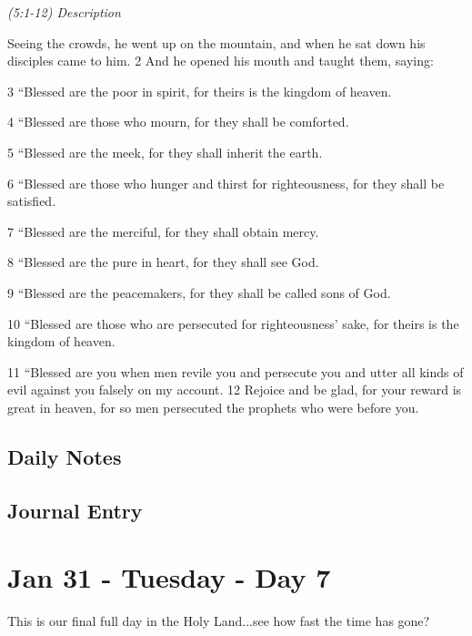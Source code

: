 \documentclass[letterpaper]{report}
\begin{document}
{\centering
	\emph{(5:1-12) Description}\\
}
\begin{multicols}{2}
Seeing the crowds, he went up on the mountain, and when he sat down his disciples came to him. 2 And he opened his mouth and taught them, saying:

3 “Blessed are the poor in spirit, for theirs is the kingdom of heaven.

4 “Blessed are those who mourn, for they shall be comforted.

5 “Blessed are the meek, for they shall inherit the earth.

6 “Blessed are those who hunger and thirst for righteousness, for they shall be satisfied.

7 “Blessed are the merciful, for they shall obtain mercy.

8 “Blessed are the pure in heart, for they shall see God.

9 “Blessed are the peacemakers, for they shall be called sons of God.

10 “Blessed are those who are persecuted for righteousness’ sake, for theirs is the kingdom of heaven.

11 “Blessed are you when men revile you and persecute you and utter all kinds of evil against you falsely on my account. 12 Rejoice and be glad, for your reward is great in heaven, for so men persecuted the prophets who were before you.
\end{multicols}

\clearpage
\subsection{Daily Notes}

\clearpage
\subsection{Journal Entry}

\clearpage
\section{Jan 31 - Tuesday - Day 7}
This is our final full day in the Holy Land...see how fast the time has gone?
\end{document}
